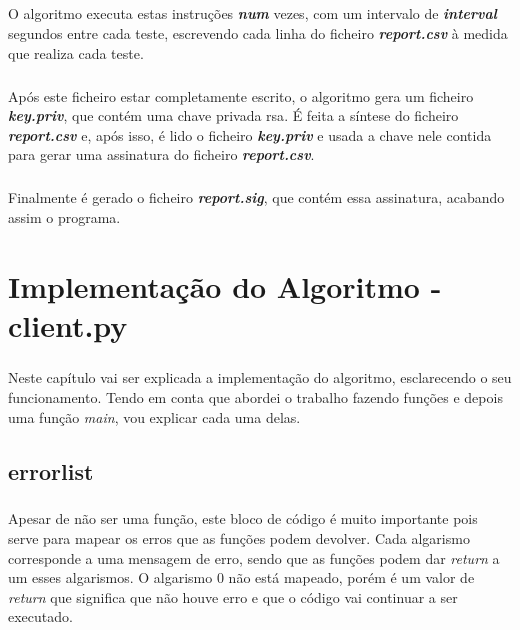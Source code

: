 \documentclass{report}
\begin{document}
\paragraph{}
O algoritmo executa estas instruções \textbf{\textit{num}} vezes, com um intervalo de \textbf{\textit{interval}} segundos entre cada teste, escrevendo cada linha do ficheiro \textbf{\textit{report.csv}} à medida que realiza cada teste.
\paragraph{}
Após este ficheiro estar completamente escrito, o algoritmo gera um ficheiro \textbf{\textit{key.priv}}, que contém uma chave privada {\acs{rsa}}. É feita a síntese do ficheiro \textbf{\textit{report.csv}} e, após isso, é lido o ficheiro \textbf{\textit{key.priv}} e usada a chave nele contida para gerar uma assinatura do ficheiro \textbf{\textit{report.csv}}.
\paragraph{}
Finalmente é gerado o ficheiro \textbf{\textit{report.sig}}, que contém essa assinatura, acabando assim o programa.



\chapter{Implementação do Algoritmo - client.py}
\label{chap.Implementacao}
\paragraph{}
Neste capítulo vai ser explicada a implementação do algoritmo, esclarecendo o seu funcionamento. Tendo em conta que abordei o trabalho fazendo funções e depois uma função \textit{main}, vou explicar cada uma delas.

\section{error\textunderscore list }
\label{sec:error}
\paragraph{}
Apesar de não ser uma função, este bloco de código é muito importante pois serve para mapear os erros que as funções podem devolver. Cada algarismo corresponde a uma mensagem de erro, sendo que as funções podem dar \textit{return} a um esses algarismos. \newline
O algarismo 0 não está mapeado, porém é um valor de \textit{return} que significa que não houve erro e que o código vai continuar a ser executado.
\end{document}
